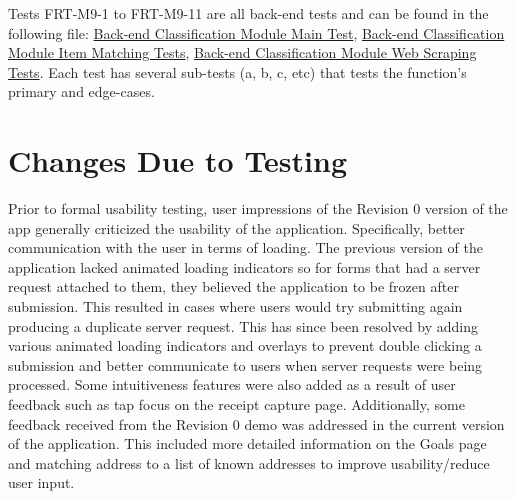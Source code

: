 \documentclass[12pt, titlepage]{article}
\begin{document}
Tests FRT-M9-1 to FRT-M9-11 are all back-end tests and can be found in the following file: \href{https://github.com/grocery-spending-tracker/grocery-spending-tracker-classification/blob/main/test/main.test.js}{Back-end Classification Module Main Test}, \href{https://github.com/grocery-spending-tracker/grocery-spending-tracker-classification/tree/main/test/classification}{Back-end Classification Module Item Matching Tests}, \href{https://github.com/grocery-spending-tracker/grocery-spending-tracker-classification/tree/main/test/scraper}{Back-end Classification Module Web Scraping Tests}. Each test has several sub-tests (a, b, c, etc) that tests the function's primary and edge-cases.

\section{Changes Due to Testing}


Prior to formal usability testing, user impressions of the Revision 0 version of the app
generally criticized the usability of the application. Specifically, better communication with
the user in terms of loading. The previous version of the application lacked animated loading
indicators so for forms that had a server request attached to them, they believed the application
to be frozen after submission. This resulted in cases where users would try submitting again producing
a duplicate server request. This has since been resolved by adding various animated loading indicators
and overlays to prevent double clicking a submission and better communicate to users when server requests
were being processed. Some intuitiveness features were also added as a result of user feedback such as
tap focus on the receipt capture page. Additionally, some feedback received from the Revision 0 demo
was addressed in the current version of the application. This included more detailed information
on the Goals page and matching address to a list of known addresses to improve usability/reduce user
input.\\
\end{document}

